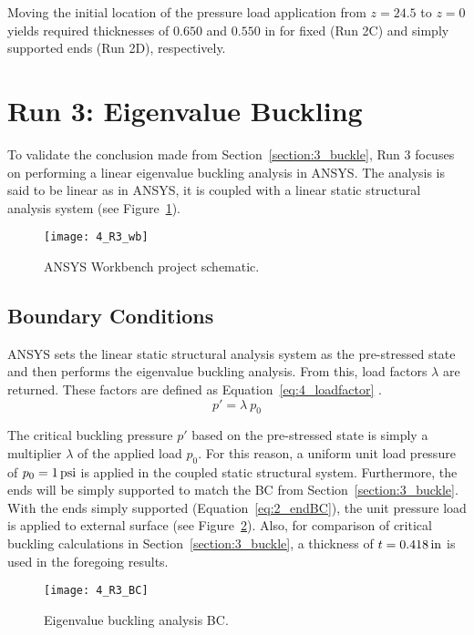 Moving the initial location of the pressure load application from $z=24.5$ to $z=0$ yields required thicknesses of $0.650$ and $0.550$ in for fixed (Run 2C) and simply supported ends (Run 2D), respectively.

\section{Run 3: Eigenvalue Buckling}
\label{section:4_R3}

To validate the conclusion made from Section~\ref{section:3_buckle}, Run 3 focuses on performing a linear eigenvalue buckling analysis in ANSYS. The analysis is said to be linear as in ANSYS, it is coupled with a linear static structural analysis system (see Figure~\ref{fig:4_R3_wb}).

\begin{figure}[H]
	\centering
	\texttt{[image: 4\_R3\_wb]}
	\caption{ANSYS Workbench project schematic.}
	\label{fig:4_R3_wb}
\end{figure}

\subsection{Boundary Conditions}

ANSYS sets the linear static structural analysis system as the pre-stressed state and then performs the eigenvalue buckling analysis. From this, load factors $\lambda$ are returned. These factors are defined as Equation~\ref{eq:4_loadfactor} \cite{ANSYS}.
\begin{equation}
	\label{eq:4_loadfactor}
	p' = \lambda \ p_0
\end{equation}

The critical buckling pressure $p'$ based on the pre-stressed state is simply a multiplier $\lambda$ of the applied load $p_0$. For this reason, a uniform unit load pressure of $p_0 = 1\,\mathrm{psi}$ is applied in the coupled static structural system. Furthermore, the ends will be simply supported to match the BC from Section~\ref{section:3_buckle}.\\


With the ends simply supported (Equation~\ref{eq:2_endBC}), the unit pressure load is applied to external surface (see Figure~\ref{fig:4_R3_BC}). Also, for comparison of critical buckling calculations in Section~\ref{section:3_buckle}, a thickness of $t=0.418\,\mathrm{in}$ is used in the foregoing results. 

\begin{figure}[H]
	\centering
	\texttt{[image: 4\_R3\_BC]}
	\caption{Eigenvalue buckling analysis BC.}
	\label{fig:4_R3_BC}
\end{figure}

